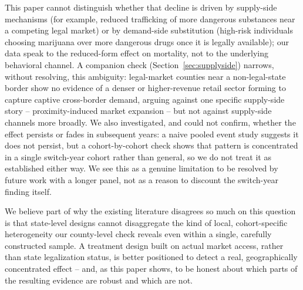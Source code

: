 \documentclass{article}
\begin{document}
This paper cannot distinguish whether that decline is driven by supply-side mechanisms (for example, reduced
trafficking of more dangerous substances near a competing legal market) or by demand-side substitution (high-risk
individuals choosing marijuana over more dangerous drugs once it is legally available); our data speak to the
reduced-form effect on mortality, not to the underlying behavioral channel. A companion check
(Section~\ref{sec:supplyside}) narrows, without resolving, this ambiguity: legal-market counties near a
non-legal-state border show no evidence of a denser or higher-revenue retail sector forming to capture captive
cross-border demand, arguing against one specific supply-side story -- proximity-induced market expansion -- but
not against supply-side channels more broadly. We also investigated, and could not
confirm, whether the effect persists or fades in subsequent years: a naive pooled event study suggests it does not
persist, but a cohort-by-cohort check shows that pattern is concentrated in a single switch-year cohort rather than
general, so we do not treat it as established either way. We see this as a genuine limitation to be resolved by
future work with a longer panel, not as a reason to discount the switch-year finding itself.

We believe part of why the existing literature disagrees so much on this question is that state-level designs
cannot disaggregate the kind of local, cohort-specific heterogeneity our county-level check reveals even within a
single, carefully constructed sample. A treatment design built on actual market access, rather than state
legalization status, is better positioned to detect a real, geographically concentrated effect -- and, as this
paper shows, to be honest about which parts of the resulting evidence are robust and which are not.

\newpage


\end{document}

